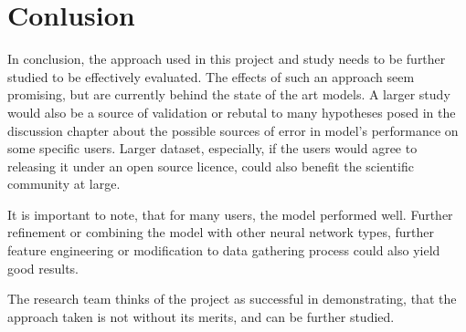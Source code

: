 
\chapter{Conlusion}

In conclusion, the approach used in this project and study needs to be further studied to be effectively evaluated. The effects of such an approach seem promising, but are currently behind the state of the art models. A larger study would also be a source of validation or rebutal to many hypotheses posed in the discussion chapter about the possible sources of error in model's performance on some specific users. Larger dataset, especially, if the users would agree to releasing it under an open source licence, could also benefit the scientific community at large.

It is important to note, that for many users, the model performed well. Further refinement or combining the model with other neural network types, further feature engineering or modification to data gathering process could also yield good results.

The research team thinks of the project as successful in demonstrating, that the approach taken is not without its merits, and can be further studied.